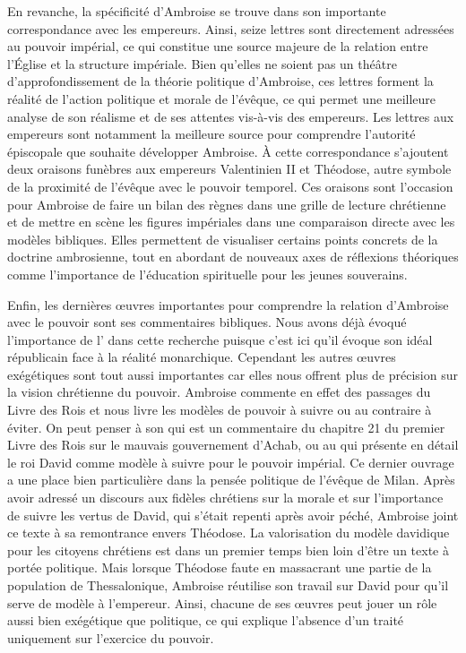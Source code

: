 En revanche, la spécificité d'Ambroise se trouve dans son importante correspondance avec les empereurs. Ainsi, seize lettres sont directement adressées au pouvoir impérial, ce qui constitue une source majeure de la relation entre l’Église et la structure impériale. Bien qu’elles ne soient pas un théâtre d’approfondissement de la théorie politique d’Ambroise, ces lettres forment la réalité de l’action politique et morale de l’évêque, ce qui permet une meilleure analyse de son réalisme et de ses attentes vis-à-vis des empereurs. Les lettres aux empereurs sont notamment la meilleure source pour comprendre l'autorité épiscopale que souhaite développer Ambroise. À cette correspondance s'ajoutent deux oraisons funèbres aux empereurs Valentinien II et Théodose, autre symbole de la proximité de l'évêque avec le pouvoir temporel. Ces oraisons sont l'occasion pour Ambroise de faire un bilan des règnes dans une grille de lecture chrétienne et de mettre en scène les figures impériales dans une comparaison directe avec les modèles bibliques. Elles permettent de visualiser certains points concrets de la doctrine ambrosienne, tout en abordant de nouveaux axes de réflexions théoriques comme l'importance de l'éducation spirituelle pour les jeunes souverains.

\bigskip

Enfin, les dernières œuvres importantes pour comprendre la relation d’Ambroise avec le pouvoir sont ses commentaires bibliques. Nous avons déjà évoqué l’importance de l’ dans cette recherche puisque c’est ici qu’il évoque son idéal républicain face à la réalité monarchique. Cependant les autres œuvres exégétiques sont tout aussi importantes car elles nous offrent plus de précision sur la vision chrétienne du pouvoir. Ambroise commente en effet des passages du Livre des Rois et nous livre les modèles de pouvoir à suivre ou au contraire à éviter. On peut penser à son  qui est un commentaire du chapitre 21 du premier Livre des Rois sur le mauvais gouvernement d’Achab, ou au  qui présente en détail le roi David comme modèle à suivre pour le pouvoir impérial. Ce dernier ouvrage a une place bien particulière dans la pensée politique de l'évêque de Milan. Après avoir adressé un discours aux fidèles chrétiens sur la morale et sur l'importance de suivre les vertus de David, qui s'était repenti après avoir péché, Ambroise joint ce texte à sa remontrance envers Théodose. La valorisation du modèle davidique pour les citoyens chrétiens est dans un premier temps bien loin d'être un texte à portée politique. Mais lorsque Théodose faute en massacrant une partie de la population de Thessalonique, Ambroise réutilise son travail sur David pour qu'il serve de modèle à l'empereur. Ainsi, chacune de ses œuvres peut jouer un rôle aussi bien exégétique que politique, ce qui explique l'absence d'un traité uniquement sur l'exercice du pouvoir.

